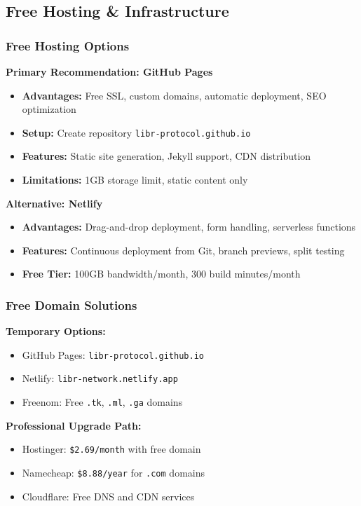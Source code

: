 \documentclass[12pt,a4paper]{article}
\begin{document}
\subsection{Free Hosting \& Infrastructure}

\subsubsection{Free Hosting Options}
\textbf{Primary Recommendation: GitHub Pages}
\begin{itemize}
    \item \textbf{Advantages:} Free SSL, custom domains, automatic deployment, SEO optimization
    \item \textbf{Setup:} Create repository \texttt{libr-protocol.github.io}
    \item \textbf{Features:} Static site generation, Jekyll support, CDN distribution
    \item \textbf{Limitations:} 1GB storage limit, static content only
\end{itemize}

\textbf{Alternative: Netlify}
\begin{itemize}
    \item \textbf{Advantages:} Drag-and-drop deployment, form handling, serverless functions
    \item \textbf{Features:} Continuous deployment from Git, branch previews, split testing
    \item \textbf{Free Tier:} 100GB bandwidth/month, 300 build minutes/month
\end{itemize}

\subsubsection{Free Domain Solutions}
\textbf{Temporary Options:}
\begin{itemize}
    \item GitHub Pages: \texttt{libr-protocol.github.io}
    \item Netlify: \texttt{libr-network.netlify.app}
    \item Freenom: Free \texttt{.tk}, \texttt{.ml}, \texttt{.ga} domains
\end{itemize}

\textbf{Professional Upgrade Path:}
\begin{itemize}
    \item Hostinger: \texttt{\$2.69/month} with free domain
    \item Namecheap: \texttt{\$8.88/year} for \texttt{.com} domains
    \item Cloudflare: Free DNS and CDN services
\end{itemize}
\end{document}

